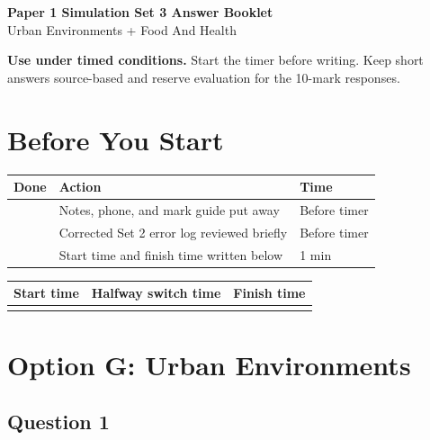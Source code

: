 \documentclass[11pt,a4paper]{article}
\newcommand{\todobox}{\fbox{\rule{0pt}{0.8em}\rule{0.8em}{0pt}}}
\begin{document}
\begin{center}
{\sffamily\bfseries\color{HeadingBlue}\LARGE Paper 1 Simulation Set 3 Answer Booklet}\\[0.25em]
{\sffamily\color{AccentTeal}\large Urban Environments + Food And Health}
\end{center}

\noindent\colorbox{SoftBlue}{%
\begin{minipage}{0.965\textwidth}
\sffamily
\textbf{\textcolor{HeadingBlue}{Use under timed conditions.}}
Start the timer before writing. Keep short answers source-based and reserve
evaluation for the 10-mark responses.
\end{minipage}
}

\section{Before You Start}

\begin{tabularx}{\textwidth}{L{0.16\textwidth}Y L{0.19\textwidth}}
\toprule
\textbf{Done} & \textbf{Action} & \textbf{Time} \\
\midrule
\todobox & Notes, phone, and mark guide put away & Before timer \\
\todobox & Corrected Set 2 error log reviewed briefly & Before timer \\
\todobox & Start time and finish time written below & 1 min \\
\bottomrule
\end{tabularx}

\vspace{0.35em}

\begin{tabularx}{\textwidth}{L{0.24\textwidth}Y Y}
\toprule
\textbf{Start time} & \textbf{Halfway switch time} & \textbf{Finish time} \\
\midrule
\rule{0pt}{1cm} & & \\
\bottomrule
\end{tabularx}

\newpage

\section{Option G: Urban Environments}

\subsection{Question 1}
\end{document}
